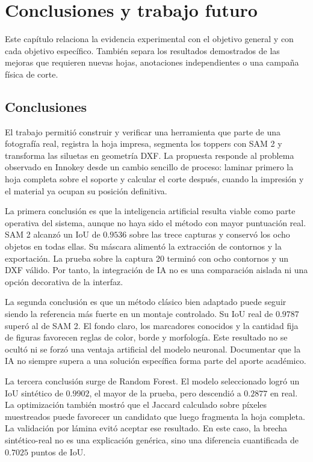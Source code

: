\chapter{Conclusiones y trabajo futuro}
\label{cap:conclusiones}

Este capítulo relaciona la evidencia experimental con el objetivo general y con cada objetivo específico. También separa los resultados demostrados de las mejoras que requieren nuevas hojas, anotaciones independientes o una campaña física de corte.

\section{Conclusiones}

El trabajo permitió construir y verificar una herramienta que parte de una fotografía real, registra la hoja impresa, segmenta los toppers con SAM 2 y transforma las siluetas en geometría DXF. La propuesta responde al problema observado en Innokey desde un cambio sencillo de proceso: laminar primero la hoja completa sobre el soporte y calcular el corte después, cuando la impresión y el material ya ocupan su posición definitiva.

La primera conclusión es que la inteligencia artificial resulta viable como parte operativa del sistema, aunque no haya sido el método con mayor puntuación real. SAM 2 alcanzó un IoU de $0.9536$ sobre las trece capturas y conservó los ocho objetos en todas ellas. Su máscara alimentó la extracción de contornos y la exportación. La prueba sobre la captura 20 terminó con ocho contornos y un DXF válido. Por tanto, la integración de IA no es una comparación aislada ni una opción decorativa de la interfaz.

La segunda conclusión es que un método clásico bien adaptado puede seguir siendo la referencia más fuerte en un montaje controlado. Su IoU real de $0.9787$ superó al de SAM 2. El fondo claro, los marcadores conocidos y la cantidad fija de figuras favorecen reglas de color, borde y morfología. Este resultado no se ocultó ni se forzó una ventaja artificial del modelo neuronal. Documentar que la IA no siempre supera a una solución específica forma parte del aporte académico.

La tercera conclusión surge de Random Forest. El modelo seleccionado logró un IoU sintético de $0.9902$, el mayor de la prueba, pero descendió a $0.2877$ en real. La optimización también mostró que el Jaccard calculado sobre píxeles muestreados puede favorecer un candidato que luego fragmenta la hoja completa. La validación por lámina evitó aceptar ese resultado. En este caso, la brecha sintético-real no es una explicación genérica, sino una diferencia cuantificada de $0.7025$ puntos de IoU.

